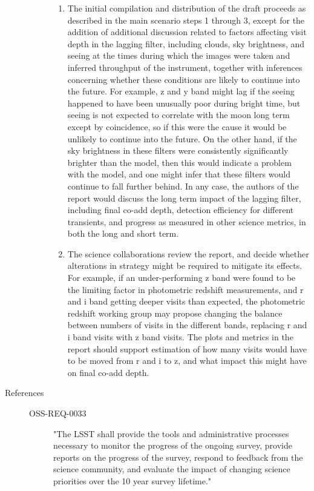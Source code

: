 \begin{description}
\begin{description}
\begin{enumerate}
\item The initial compilation and distribution of the draft proceeds as described in the main scenario steps 1 through 3, except for the addition of additional discussion related to factors affecting visit depth in the lagging filter, including clouds, sky brightness, and seeing at the times during which the images were taken and inferred throughput of the instrument, together with inferences concerning whether these conditions are likely to continue into the future. For example, z and y band might lag if the seeing happened to have been unusually poor during bright time, but seeing is not expected to correlate with the moon long term except by coincidence, so if this were the cause it would be unlikely to continue into the future. On the other hand, if the sky brightness in these filters were consistently significantly brighter than the model, then this would indicate a problem with the model, and one might infer that these filters would continue to fall further behind. In any case, the authors of the report would discuss the long term impact of the lagging filter, including final co-add depth, detection efficiency for different transients, and progress as measured in other science metrics, in both the long and short term.
\item The science collaborations review the report, and decide whether alterations in strategy might be required to mitigate its effects. For example, if an under-performing z band were found to be the limiting factor in photometric redshift measurements, and r and i band getting deeper visits than expected, the photometric redshift working group may propose changing the balance between numbers of visits in the different bands, replacing r and i band visits with z band visits. The plots and metrics in the report should support estimation of how many visits would have to be moved from r and i to z, and what impact this might have on final co-add depth.
\end{enumerate}
\end{description}
\item[{References}] \begin{description}
\item[{OSS-REQ-0033}] "The LSST shall provide the tools and administrative processes necessary to monitor the progress of the ongoing survey, provide reports on the progress of the survey, respond to feedback from the science community, and evaluate the impact of changing science priorities over the 10 year survey lifetime."

\end{description}
\end{description}
